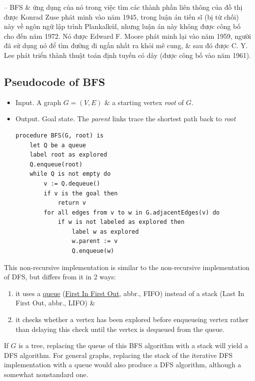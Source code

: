 \documentclass[oneside]{book}
\begin{document}
-- BFS \& ứng dụng của nó trong việc tìm các thành phần liên thông của đồ thị được {\sc Konrad Zuse} phát minh vào năm 1945, trong luận án tiến sĩ (bị từ chối) này về ngôn ngữ lập trình Plankalk\"ul, nhưng luận án này không được công bố cho đến năm 1972. Nó được {\sc Edward F. Moore} phát minh lại vào năm 1959, người đã sử dụng nó để tìm đường đi ngắn nhất ra khỏi mê cung, \& sau đó được {\sc C. Y. Lee} phát triển thành thuật toán định tuyến có dây (được công bố vào năm 1961).


\subsection{Pseudocode of BFS}

\begin{itemize}
	\item {\sf Input.} A graph $G = (V,E)$ \& a starting vertex {\it root} of $G$.
	\item {\sf Output.} Goal state. The {\it parent} links trace the shortest path back to {\it root}
	\begin{verbatim}
procedure BFS(G, root) is
    let Q be a queue
    label root as explored
    Q.enqueue(root)
    while Q is not empty do
        v := Q.dequeue()
        if v is the goal then
            return v
        for all edges from v to w in G.adjacentEdges(v) do
            if w is not labeled as explored then
                label w as explored
                w.parent := v
                Q.enqueue(w)
	\end{verbatim}
\end{itemize}
This non-recursive implementation is similar to the non-recursive implementation of DFS, but differs from it in 2 ways:
\begin{enumerate}
	\item it uses a \href{https://en.wikipedia.org/wiki/Queue_(abstract_data_type)}{queue} (\href{https://en.wikipedia.org/wiki/First_In_First_Out}{First In First Out}, abbr., FIFO) instead of a stack (Last In First Out, abbr., LIFO) \&
	\item it checks whether a vertex has been explored before enqueueing vertex rather than delaying this check until the vertex is dequeued from the queue.
\end{enumerate}
If $G$ is a tree, replacing the queue of this BFS algorithm with a stack will yield a DFS algorithm. For general graphs, replacing the stack of the iterative DFS implementation with a queue would also produce a DFS algorithm, although a somewhat nonstandard one.
\end{document}
